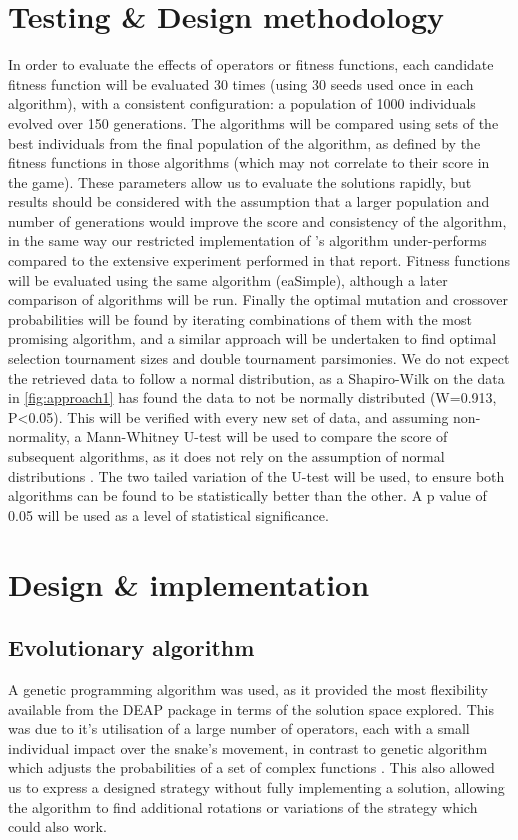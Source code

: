 \documentclass[british,10pt,a4paper]{article}
\begin{document}
\section{Testing \& Design methodology}
\label{sec:methodology}
In order to evaluate the effects of operators or fitness functions, each candidate fitness function will be evaluated 30 times (using 30 seeds used once in each algorithm), with a consistent configuration: a population of 1000 individuals evolved over 150 generations. The algorithms will be compared using sets of the best individuals from the final population of the algorithm, as defined by the fitness functions in those algorithms (which may not correlate to their score in the game). These parameters allow us to evaluate the solutions rapidly, but results should be considered with the assumption that a larger population and number of generations would improve the score and consistency of the algorithm, in the same way our restricted implementation of \citet{Ehlis2000-sz}'s algorithm under-performs compared to the extensive experiment performed in that report. Fitness functions will be evaluated using the same algorithm (eaSimple), although a later comparison of algorithms will be run. Finally the optimal mutation and crossover probabilities will be found by iterating combinations of them with the most promising algorithm, and a similar approach will be undertaken to find optimal selection tournament sizes and double tournament parsimonies. We do not expect the retrieved data to follow a normal distribution, as a Shapiro-Wilk \cite{Shapiro1965-my} on the data in \autoref{fig:approach1} has found the data to not be normally distributed (W=0.913, P<0.05). This will be verified with every new set of data, and assuming non-normality, a Mann-Whitney U-test will be used to compare the score of subsequent algorithms, as it does not rely on the assumption of normal distributions \cite{Timm2002-lo}.  The two tailed variation of the U-test will be used, to ensure both algorithms can be found to be statistically better than the other. A p value of 0.05 will be used as a level of statistical significance.


\section{Design \& implementation}
\subsection{Evolutionary algorithm}
A genetic programming algorithm was used, as it provided the most flexibility available from the DEAP package in terms of the solution space explored. This was due to it's utilisation of a large number of operators, each with a small individual impact over the snake's movement, in contrast to genetic algorithm which adjusts the probabilities of a set of complex functions \cite{Yeh2016-ts}. This also allowed us to express a designed strategy without fully implementing a solution, allowing the algorithm to find additional rotations or variations of the strategy which could also work.
\end{document}
